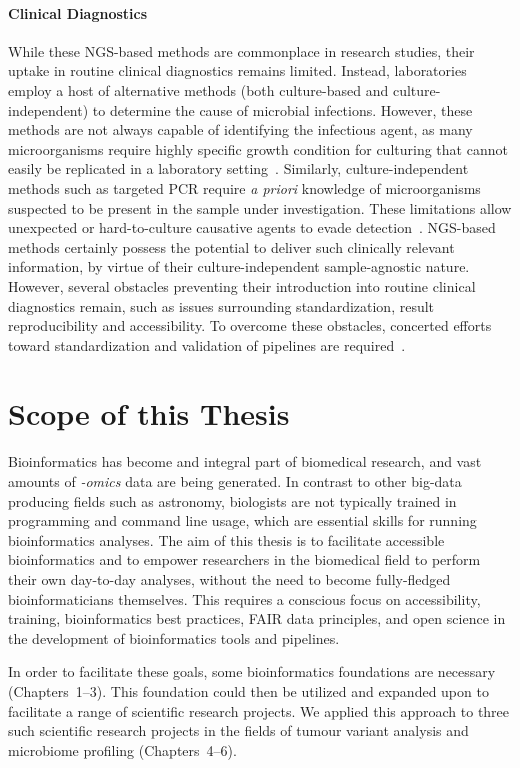 \begin{justify}
\paragraph{Clinical Diagnostics}
While these NGS-based methods are commonplace in research studies, their uptake in routine clinical diagnostics remains limited. Instead, laboratories employ a host of alternative methods (both culture-based and culture-independent) to determine the cause of microbial infections. However, these methods are not always capable of identifying the infectious agent, as many microorganisms require highly specific growth condition for culturing that cannot easily be replicated in a laboratory setting~\cite{lagier2015rebirth}. Similarly, culture-independent methods such as targeted PCR require \emph{a priori} knowledge of microorganisms suspected to be present in the sample under investigation. These limitations allow unexpected or hard-to-culture causative agents to evade detection~\cite{yang2004pcr}. NGS-based methods certainly possess the potential to deliver such clinically relevant information, by virtue of their culture-independent sample-agnostic nature. However, several obstacles preventing their introduction into routine clinical diagnostics remain, such as issues surrounding standardization, result reproducibility and accessibility. To overcome these obstacles, concerted efforts toward standardization and validation of pipelines are required~\cite{caliendo2013better}.

\section{Scope of this Thesis}

Bioinformatics has become and integral part of biomedical research, and vast amounts of \emph{-omics} data are being generated.
In contrast to other big-data producing fields such as astronomy, biologists are not typically trained in programming and command line usage, which are essential skills for running bioinformatics analyses.
The aim of this thesis is to facilitate accessible bioinformatics and to empower researchers in the biomedical field to perform their own day-to-day analyses, without the need to become fully-fledged bioinformaticians themselves.
This requires a conscious focus on accessibility, training, bioinformatics best practices, FAIR data principles, and open science in the development of bioinformatics tools and pipelines.

In order to facilitate these goals, some bioinformatics foundations are necessary (Chapters~1--3).
This foundation could then be utilized and expanded upon to facilitate a range of scientific research projects.
We applied this approach to three such scientific research projects in the fields of tumour variant analysis and microbiome profiling (Chapters~4--6).


\end{justify}
